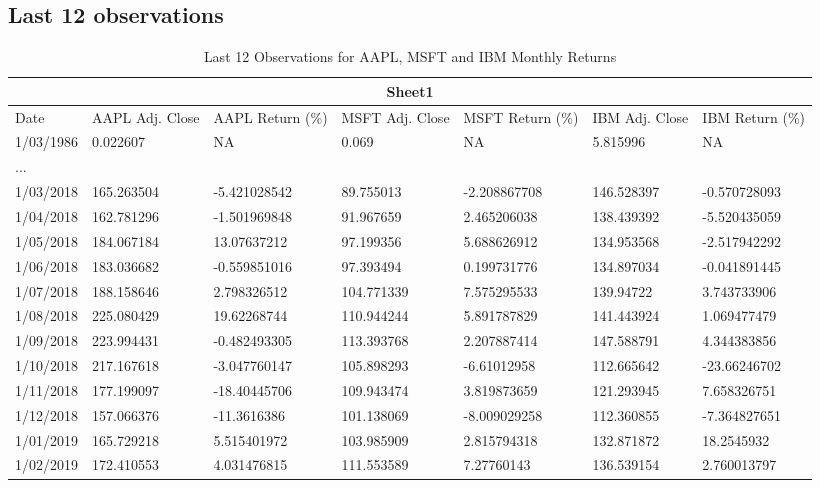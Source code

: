 \documentclass[12pt]{article}
\begin{document}
\subsection{Last 12 observations}
\begin{table}[htb]
	\footnotesize
	\centering
	\caption{Last 12 Observations for AAPL, MSFT and IBM Monthly Returns}
	\begin{tabular}{ |p{1.5cm}||p{2cm}|p{2cm}|p{2cm}|p{2cm}|p{2cm}|p{2cm}| }
		\hline
		\multicolumn{7}{|c|}{Sheet1}\\
		\hline
		Date&AAPL \text{\qquad} Adj. Close&AAPL \text{\qquad} Return (\%)&MSFT \text{\qquad} Adj. Close&MSFT \text{\qquad} Return (\%)&IBM \text{\qquad} Adj. Close&IBM \text{\qquad} Return (\%)\\
		\hline
		1/03/1986 & 0.022607 & NA & 0.069 & NA & 5.815996 & NA\\
		\hline
		... &&&&&&\\
		\hline
		1/03/2018 &	165.263504 & -5.421028542 & 89.755013	& -2.208867708	& 146.528397 &	-0.570728093\\
		1/04/2018 &	162.781296 & -1.501969848 & 91.967659	& 2.465206038	& 138.439392 &	-5.520435059\\
		1/05/2018 &	184.067184 & 13.07637212 & 97.199356	& 5.688626912	& 134.953568 &	-2.517942292\\
		1/06/2018 &	183.036682 & -0.559851016 & 97.393494	& 0.199731776	& 134.897034 &	-0.041891445\\
		1/07/2018 &	188.158646 & 2.798326512 & 104.771339	& 7.575295533	& 139.94722	 &  3.743733906\\
		1/08/2018 &	225.080429 & 19.62268744 & 110.944244	& 5.891787829	& 141.443924 &	1.069477479\\
		1/09/2018 &	223.994431 & -0.482493305 & 113.393768	& 2.207887414	& 147.588791 &	4.344383856\\
		1/10/2018 &	217.167618 & -3.047760147 & 105.898293	& -6.61012958	& 112.665642 &	-23.66246702\\
		1/11/2018 &	177.199097 & -18.40445706 & 109.943474	& 3.819873659	& 121.293945 &	7.658326751\\
		1/12/2018 &	157.066376 & -11.3616386 & 101.138069	& -8.009029258	& 112.360855 &	-7.364827651\\
		1/01/2019 &	165.729218 & 5.515401972 & 103.985909	& 2.815794318	& 132.871872 &	18.2545932\\
		1/02/2019 &	172.410553 & 4.031476815 & 111.553589	& 7.27760143	& 136.539154 &	2.760013797\\
		\hline
	\end{tabular}
\end{table}
\end{document}
